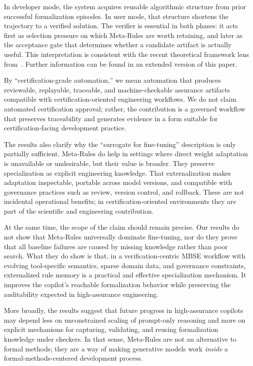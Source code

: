 \documentclass[conference]{IEEEtran}
\begin{document}
In developer mode, the system acquires reusable algorithmic structure from prior successful formalization episodes. In user mode, that structure shortens the trajectory to a verified solution. The verifier is essential in both phases: it acts first as selection pressure on which Meta-Rules are worth retaining, and later as the acceptance gate that determines whether a candidate artifact is actually useful. This interpretation is consistent with the recent theoretical framework lens
from~\cite{e28030332}. Further information can be found in an extended version of this paper.

By ``certification-grade automation,'' we mean automation that produces reviewable, replayable, traceable, and machine-checkable assurance artifacts compatible with certification-oriented engineering workflows. We do not claim automated certification approval; rather, the contribution is a governed workflow that preserves traceability and generates evidence in a form suitable for certification-facing development practice.

The results also clarify why the ``surrogate for fine-tuning'' description is only partially sufficient. Meta-Rules do help in settings where direct weight adaptation is unavailable or undesirable, but their value is broader. They preserve specialization as explicit engineering knowledge. That externalization makes adaptation inspectable, portable across model versions, and compatible with governance practices such as review, version control, and rollback. These are not incidental operational benefits; in certification-oriented environments they are part of the scientific and engineering contribution.

At the same time, the scope of the claim should remain precise. Our results do not show that Meta-Rules universally dominate fine-tuning, nor do they prove that all baseline failures are caused by missing knowledge rather than poor search. What they do show is that, in a verification-centric MBSE workflow with evolving tool-specific semantics, sparse domain data, and governance constraints, externalized rule memory is a practical and effective specialization mechanism. It improves the copilot's reachable formalization behavior while preserving the auditability expected in high-assurance engineering.

More broadly, the results suggest that future progress in high-assurance copilots may depend less on unconstrained scaling of prompt-only reasoning and more on explicit mechanisms for capturing, validating, and reusing formalization knowledge under checkers. In that sense, Meta-Rules are not an alternative to formal methods; they are a way of making generative models work \emph{inside} a formal-methods-centered development process.
\end{document}
